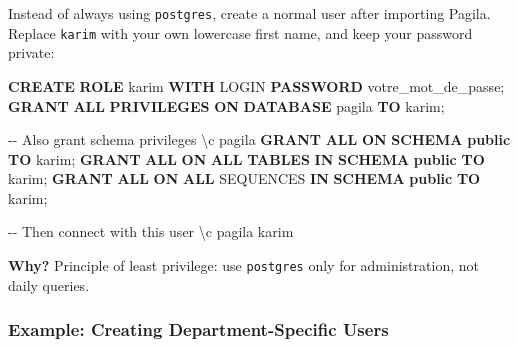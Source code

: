 \documentclass[
  letterpaper,
  DIV=11,
  numbers=noendperiod]{scrartcl}
\newenvironment{Shaded}{\begin{snugshade}}{\end{snugshade}}
\newcommand{\CommentTok}[1]{\textcolor[rgb]{0.37,0.37,0.37}{#1}}
\newcommand{\KeywordTok}[1]{\textcolor[rgb]{0.00,0.23,0.31}{\textbf{#1}}}
\newcommand{\NormalTok}[1]{\textcolor[rgb]{0.00,0.23,0.31}{#1}}
\newcommand{\StringTok}[1]{\textcolor[rgb]{0.13,0.47,0.30}{#1}}
\begin{document}
Instead of always using \texttt{postgres}, create a normal user after
importing Pagila. Replace \texttt{karim} with your own lowercase first
name, and keep your password private:

\begin{Shaded}
\begin{Highlighting}[]
\KeywordTok{CREATE} \KeywordTok{ROLE}\NormalTok{ karim }\KeywordTok{WITH}\NormalTok{ LOGIN }\KeywordTok{PASSWORD} \StringTok{\textquotesingle{}votre\_mot\_de\_passe\textquotesingle{}}\NormalTok{;}
\KeywordTok{GRANT} \KeywordTok{ALL} \KeywordTok{PRIVILEGES} \KeywordTok{ON} \KeywordTok{DATABASE}\NormalTok{ pagila }\KeywordTok{TO}\NormalTok{ karim;}

\CommentTok{{-}{-} Also grant schema privileges}
\NormalTok{\textbackslash{}c pagila}
\KeywordTok{GRANT} \KeywordTok{ALL} \KeywordTok{ON} \KeywordTok{SCHEMA} \KeywordTok{public} \KeywordTok{TO}\NormalTok{ karim;}
\KeywordTok{GRANT} \KeywordTok{ALL} \KeywordTok{ON} \KeywordTok{ALL} \KeywordTok{TABLES} \KeywordTok{IN} \KeywordTok{SCHEMA} \KeywordTok{public} \KeywordTok{TO}\NormalTok{ karim;}
\KeywordTok{GRANT} \KeywordTok{ALL} \KeywordTok{ON} \KeywordTok{ALL}\NormalTok{ SEQUENCES }\KeywordTok{IN} \KeywordTok{SCHEMA} \KeywordTok{public} \KeywordTok{TO}\NormalTok{ karim;}

\CommentTok{{-}{-} Then connect with this user}
\NormalTok{\textbackslash{}c pagila karim}
\end{Highlighting}
\end{Shaded}

\textbf{Why?} Principle of least privilege: use \texttt{postgres} only
for administration, not daily queries.

\subsubsection{Example: Creating Department-Specific
Users}\label{example-creating-department-specific-users}
\end{document}
